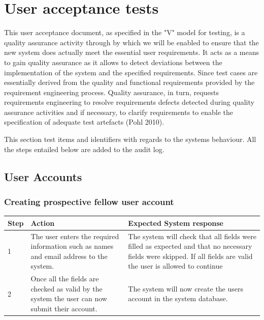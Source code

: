 \documentclass[12pt]{article}
\begin{document}
\section{User acceptance tests}
This user acceptance document, as specified in the "V" model for testing, is a quality assurance activity through by which we will be enabled to ensure that the new system does actually meet the essential user requirements. It acts as a means to gain quality assurance as it allows to detect deviations between the implementation of the system and the specified requirements. Since test cases are essentially derived from the quality and functional requirements provided by the requirement engineering process. Quality assurance, in turn, requests requirements engineering to resolve  requirements defects detected during quality assurance activities and if necessary, to clarify requirements to enable the specification of adequate test artefacts (Pohl 2010).

This section test items and identifiers with regards to the systems behaviour. All the steps entailed below are added to the audit log.

\subsection{User Accounts}

\subsubsection{Creating prospective fellow user account}

\begin{center}
\begin{tabular}{|l|p{6cm}|p{8cm}|}
\hline
Step & Action & Expected System response \\
\hline
1 & The user enters the required information such as names and email address to the system.  & The system will check that all fields were filled as expected and that no necessary fields were skipped. If all fields are valid the user is allowed to continue \\
\hline
2 & Once all the fields are checked as valid by the system the user can now submit their account. & The system will now create the users account in the system database. \\
\hline
\end{tabular}
\end{center}
\end{document}
